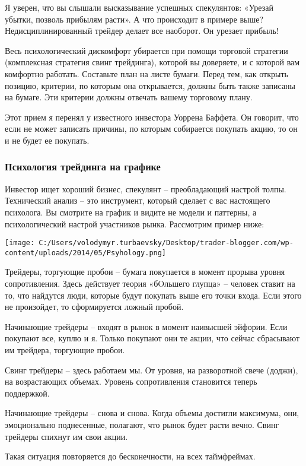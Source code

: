 \documentclass[a5paper]{article}
\begin{document}
Я уверен, что вы слышали высказывание успешных спекулянтов: «Урезай убытки, позволь прибылям расти». А что происходит в примере выше? Недисциплинированный трейдер делает все наоборот. Он урезает прибыль!

Весь психологический дискомфорт убирается при помощи торговой стратегии (комплексная стратегия свинг трейдинга), которой вы доверяете, и с которой вам комфортно работать. Составьте план на листе бумаги. Перед тем, как открыть позицию, критерии, по которым она открывается, должны быть также записаны на бумаге. Эти критерии должны отвечать вашему торговому плану.

Этот прием я перенял у известного инвестора Уоррена Баффета. Он
говорит, что если не может записать причины, по которым собирается
покупать акцию, то он и не будет ее покупать.

\subsubsection{Психология трейдинга на графике}

Инвестор ищет хороший бизнес, спекулянт – преобладающий настрой
толпы. Технический анализ – это инструмент, который сделает с вас
настоящего психолога. Вы смотрите на график и видите не модели и
паттерны, а психологический настрой участников рынка. Рассмотрим
пример ниже:

\texttt{[image: C:/Users/volodymyr.turbaevsky/Desktop/trader-blogger.com/wp-content/uploads/2014/05/Psyhology.png]}

Трейдеры, торгующие пробои – бумага покупается в момент прорыва уровня сопротивления. Здесь действует теория «бOльшего глупца» – человек ставит на то, что найдутся люди, которые будут покупать выше его точки входа. Если этого не произойдет, то сформируется ложный пробой.

Начинающие трейдеры – входят в рынок в момент наивысшей эйфории. Если покупают все, куплю и я. Только покупают они те акции, что сейчас сбрасывают им трейдера, торгующие пробои.

Свинг трейдеры – здесь работаем мы. От уровня, на разворотной свече (доджи), на возрастающих объемах. Уровень сопротивления становится теперь поддержкой.

Начинающие трейдеры – снова и снова. Когда объемы достигли максимума, они, эмоционально поднесенные, полагают, что рынок будет расти вечно. Свинг трейдеры спихнут им свои акции.

Такая ситуация повторяется до бесконечности, на всех таймфреймах.
\end{document}
